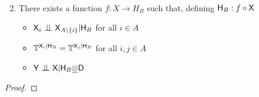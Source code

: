 \begin{theorem}
\begin{enumerate}
\begin{align}
    \end{align}
    \item There exists a function $f:X\to H_B$ such that, defining $\mathsf{H}_B:f\circ \mathsf{X}$
        \begin{itemize}
            \item $\RV{X}_i\CI\RV{X}_{A\setminus\{i\}}|\RV{H}_B$ for all $i\in A$
            \item $\mathbb{T}^{\mathsf{X}_i|\mathsf{H}_B}=\mathbb{T}^{\mathsf{X}_j|\mathsf{H}_B}$ for all $i,j\in A$
            \item $\RV{Y}\CI\RV{X}|\RV{H}_B\utimes \RV{D}$
        \end{itemize}
\end{enumerate}

\end{theorem}



\begin{proof}
\end{proof}